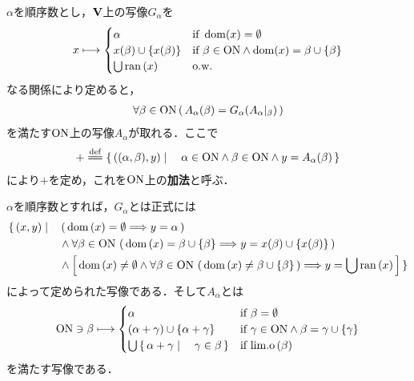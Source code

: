 	\begin{screen}
		\begin{dfn}[順序数の加法]
			$\alpha$を順序数とし，$\mathbf{V}$上の写像$G_\alpha$を
			\begin{align}
				x \longmapsto 
				\begin{cases}
					\alpha & \mbox{if } \operatorname{dom}(x) = \emptyset \\
					x(\beta) \cup \{x(\beta)\} & \mbox{if } \beta \in \mathrm{ON} \wedge \operatorname{dom}(x) = \beta \cup \{\beta\} \\
					\bigcup \operatorname*{ran} \left(x\right) & \mbox{o.w.}
				\end{cases}
			\end{align}
			なる関係により定めると，
			\begin{align}
				\forall \beta \in \mathrm{ON}\, (\, A_\alpha(\beta) = G_\alpha(A_\alpha|_\beta)\, )
			\end{align}
			を満たす$\mathrm{ON}$上の写像$A_\alpha$が取れる．ここで
			\begin{align}
				+ \defeq \Set{((\alpha,\beta),y)}{\alpha \in \ON \wedge \beta \in \ON \wedge y = A_\alpha (\beta)}
			\end{align}
			により$+$を定め，これを$\mathrm{ON}$上の{\bf 加法}と呼ぶ．
		\end{dfn}
	\end{screen}
	
	$\alpha$を順序数とすれば，$G_\alpha$とは正式には
	\begin{align}
		\{\, (x,y) \mid \quad &\left(\, \operatorname*{dom} \left(x\right) = \emptyset \Longrightarrow y = \alpha\, \right) \\
		&\wedge \forall \beta \in \mathrm{ON}\, \left(\, \operatorname*{dom} \left(x\right) = \beta \cup \{\beta\} \Longrightarrow y = x(\beta) \cup \{x(\beta)\}\, \right) \\
		&\wedge \left[\, \operatorname*{dom} \left(x\right) \neq \emptyset \wedge \forall \beta \in \mathrm{ON}\, \left(\, \operatorname*{dom} \left(x\right) \neq \beta \cup \{\beta\}\, \right)
		\Longrightarrow y = \bigcup \operatorname*{ran} \left(x\right)\, \right]\, \}
	\end{align}
	によって定められた写像である．そして$A_\alpha$とは
	\begin{align}
		\mathrm{ON} \ni \beta \longmapsto
		\begin{cases}
			\alpha & \mbox{if } \beta = \emptyset \\
			(\alpha + \gamma) \cup \{\alpha + \gamma\} & \mbox{if } \gamma \in \mathrm{ON} \wedge \beta = \gamma \cup \{\gamma\} \\
			\bigcup \left\{\, \alpha + \gamma \mid \quad \gamma \in \beta\, \right\} & \mbox{if } \mathrm{lim.o}\left(\beta\right)
		\end{cases}
	\end{align}
	を満たす写像である．
	
